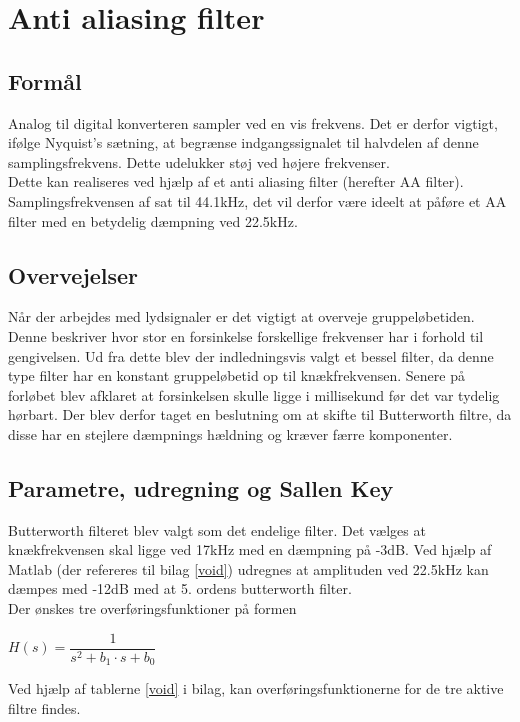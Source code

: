 
\section{Anti aliasing filter}
\subsection{Formål}
Analog til digital konverteren sampler ved en vis frekvens. Det er derfor vigtigt, ifølge Nyquist’s sætning, at begrænse indgangssignalet til halvdelen af denne samplingsfrekvens. Dette udelukker støj ved højere frekvenser.\\

Dette kan realiseres ved hjælp af et anti aliasing filter (herefter AA filter). Samplingsfrekvensen af sat til 44.1kHz, det vil derfor være ideelt at påføre et AA filter med en betydelig dæmpning ved 22.5kHz.\\
\subsection{Overvejelser}
Når der arbejdes med lydsignaler er det vigtigt at overveje gruppeløbetiden. Denne beskriver hvor stor en forsinkelse forskellige frekvenser har i forhold til gengivelsen. Ud fra dette blev der indledningsvis valgt et bessel filter, da denne type filter har en konstant gruppeløbetid op til knækfrekvensen. Senere på forløbet blev afklaret at forsinkelsen skulle ligge i millisekund før det var tydelig hørbart. Der blev derfor taget en beslutning om at skifte til Butterworth filtre, da disse har en stejlere dæmpnings hældning og kræver færre komponenter.\\
\subsection{Parametre, udregning og Sallen Key}\label{sec::anfilter_sallenpara}
Butterworth filteret blev valgt som det endelige filter. 
Det vælges at knækfrekvensen skal ligge ved 17kHz med en dæmpning på -3dB. Ved hjælp af Matlab (der refereres til bilag \ref{void}) udregnes at amplituden ved 22.5kHz kan dæmpes med -12dB med at 5. ordens butterworth filter.\\
Der ønskes tre overføringsfunktioner på formen\\
\begin{center}
	$H(s) = \dfrac{1}{s^2+b_1\cdot s + b_0}$\label{eq::anfilter_standardeq}\\
\end{center}
Ved hjælp af tablerne \ref{void} i bilag, kan overføringsfunktionerne for de tre aktive filtre findes.

